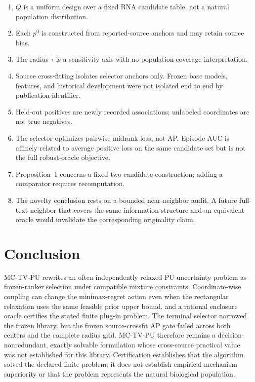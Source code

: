 \documentclass[preprint,review,12pt]{elsarticle}
\begin{document}
\begin{enumerate}[leftmargin=*]
  \item \(Q\) is a uniform design over a fixed RNA candidate table, not a
  natural population distribution.
  \item Each \(p^0\) is constructed from reported-source anchors and may retain
  source bias.
  \item The radius \(\tau\) is a sensitivity axis with no population-coverage
  interpretation.
  \item Source cross-fitting isolates selector anchors only. Frozen base models,
  features, and historical development were not isolated end to end by
  publication identifier.
  \item Held-out positives are newly recorded associations; unlabeled
  coordinates are not true negatives.
  \item The selector optimizes pairwise midrank loss, not AP. Episode AUC is
  affinely related to average positive loss on the same candidate set but is
  not the full robust-oracle objective.
  \item Proposition~1 concerns a fixed two-candidate construction; adding a
  comparator requires recomputation.
  \item The novelty conclusion rests on a bounded near-neighbor audit. A future
  full-text neighbor that covers the same information structure and an
  equivalent oracle would invalidate the corresponding originality claim.
\end{enumerate}

\section{Conclusion}

MC-TV-PU rewrites an often independently relaxed PU uncertainty problem as
frozen-ranker selection under compatible mixture constraints. Coordinate-wise
coupling can change the minimax-regret action even when the rectangular
relaxation uses the same feasible prior upper bound, and a rational enclosure
oracle certifies the stated finite plug-in problem. The terminal selector
narrowed the frozen library, but the frozen source-crossfit AP gate
failed across both centers and the complete radius grid. MC-TV-PU therefore
remains a decision-nonredundant, exactly solvable formulation whose
cross-source practical value was not established for this library.
Certification establishes that the algorithm solved the declared finite
problem; it does not establish empirical mechanism superiority or that the
problem represents the natural biological population.
\end{document}
